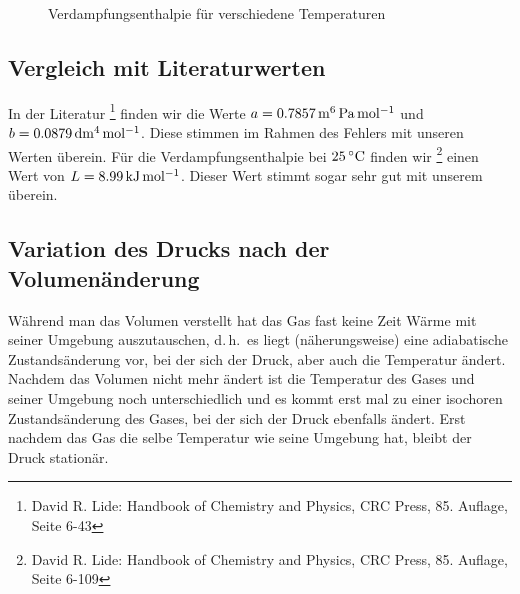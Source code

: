 \begin{figure}
    
    \caption{Verdampfungsenthalpie für verschiedene Temperaturen}
    \label{diag:L}
\end{figure}


\subsection{Vergleich mit Literaturwerten}

In der Literatur%
\footnote{David R. Lide: Handbook of Chemistry and Physics, CRC Press, 85. Auflage, Seite 6-43}
finden wir die Werte $a = \unit[0.7857]{m^6\, Pa\, mol^{-1}}$ und $b = \unit[0.0879]{dm^4\, mol^{-1}}$. Diese stimmen im Rahmen des Fehlers mit unseren Werten überein. Für die Verdampfungsenthalpie bei $\unit[25]{ ^\circ C}$ finden wir%
\footnote{David R. Lide: Handbook of Chemistry and Physics, CRC Press, 85. Auflage, Seite 6-109}
einen Wert von $L = \unit[8.99]{kJ\, mol^{-1}}$. Dieser Wert stimmt sogar sehr gut mit unserem überein.

\subsection{Variation des Drucks nach der Volumenänderung}

Während man das Volumen verstellt hat das Gas fast keine Zeit Wärme mit seiner Umgebung auszutauschen, d.\,h.\ es liegt (näherungsweise) eine adiabatische Zustandsänderung vor, bei der sich der Druck, aber auch die Temperatur ändert. Nachdem das Volumen nicht mehr ändert ist die Temperatur des Gases und seiner Umgebung noch unterschiedlich und es kommt erst mal zu einer isochoren Zustandsänderung des Gases, bei der sich der Druck ebenfalls ändert. Erst nachdem das Gas die selbe Temperatur wie seine Umgebung hat, bleibt der Druck stationär.

